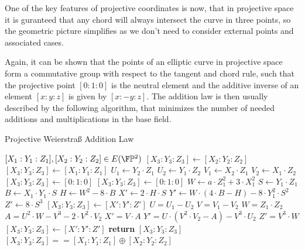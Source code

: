One of the key features of projective coordinates is now, that in projective space it is guranteed that any chord will always intersect the curve in three points, so the geometric picture simplifies as we don't need to consider external points and associated cases.


Again, it can be shown that the points of an elliptic curve in projective space form a commutative group with respect to the tangent and chord rule, such that the projective point $[0:1:0]$ is the neutral element and the additive inverse of an element $[x:y:z]$ is given by $[x:-y:z]$. The addition law is then usually described by the following algorithm, that minimizes the number of needed additions and multiplications in the base field. 

\begin{algorithm}\caption{Projective Weierstraß Addition Law}
\label{alg_projective_group_law}
\begin{algorithmic}[0]
\Require $[X_1:Y_1:Z_1],[X_2:Y_2:Z_2] \in E(\F\mathbb{P}^2)$
\If{$[X_1:Y_1:Z_1] == [0:1:0]$}
  \State $[X_3:Y_3:Z_3] \gets [X_2:Y_2:Z_2]$
\ElsIf{$[X_2:Y_2:Z_2] == [0:1:0]$}
  \State $[X_3:Y_3:Z_3] \gets [X_1:Y_1:Z_1]$
\Else
  \State $U_1 \gets Y_2\cdot Z_1$
  \State $U_2 \gets Y_1\cdot Z_2$
  \State $V_1 \gets X_2\cdot Z_1$
  \State $V_2 \gets X_1\cdot Z_2$
      $[X_3:Y_3:Z_3] \gets [0:1:0]$
    \Else
        $[X_3:Y_3:Z_3] \gets [0:1:0]$
      \Else
        \State $W \gets a\cdot Z_1^2 + 3\cdot X_1^2$
        \State $S \gets Y_1\cdot Z_1$
        \State $B \gets X_1\cdot Y_1\cdot S$
        \State $H \gets W^2 - 8\cdot B$
        \State $X' \gets 2\cdot H\cdot S$
        \State $Y' \gets W\cdot (4\cdot B - H) - 8\cdot Y_1^2\cdot S^2$
        \State $Z' \gets 8\cdot S^3$
        \State $[X_3:Y_3:Z_3] \gets [X':Y':Z']$
      \EndIf
    \EndIf
  \Else
    \State $U = U_1 - U_2$
    \State $V = V_1 - V_2$
    \State $W = Z_1\cdot Z_2$
    \State $A = U^2\cdot W - V^3 - 2\cdot V^2\cdot V_2$
    \State $X' = V\cdot A$
    \State $Y' = U\cdot(V^2\cdot V_2 - A) - V^3\cdot U_2$
    \State $Z' = V^3\cdot W$
    \State $[X_3:Y_3:Z_3]\gets [X':Y':Z']$
  \EndIf
\EndIf
\State \textbf{return} $[X_3:Y_3:Z_3]$
\EndProcedure
\Ensure $ [X_3:Y_3:Z_3] == [X_1:Y_1:Z_1] \oplus [X_2:Y_2:Z_2]$
\end{algorithmic}
\end{algorithm}

